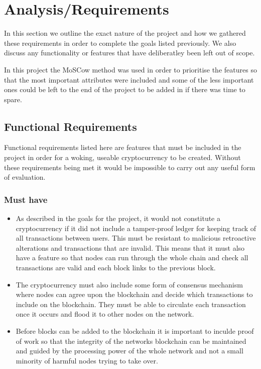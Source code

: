 \documentclass{l4proj}
\begin{document}
\chapter{Analysis/Requirements}
In this section we outline the exact nature of the project and how we gathered these requirements in order to 
complete the goals listed previously. We also discuss any functionality or features that have deliberatley been
left out of scope.

In this project the MoSCow method was used in order to prioritise the features so that the most important attributes
were included and some of the less important ones could be left to the end of the project to be added in if there was
time to spare.

\section{Functional Requirements}
Functional requirements listed here are features that must be included in the project in order for a woking,
useable cryptocurrency to be created. Without these requirements being met it would be impossible to carry out any
useful form of evaluation.

\subsection{Must have}
\begin{itemize}
    \item As described in the goals for the project, it would not constitute a cryptocurrency if it did not include a tamper-proof
        ledger for keeping track of all transactions between users. This must be resistant to malicious retroactive alterations
        and transactions that are invalid. This means that it must also have a feature so that nodes can run through the 
        whole chain and check all transactions are valid and each block links to the previous block.

    \item The cryptocurrency must also include some form of consensus mechanism where nodes can agree upon the blockchain
        and decide which transactions to include on the blockchain. They must be able to circulate each transaction once
        it occurs and flood it to other nodes on the network.
    
    \item Before blocks can be added to the blockchain it is important to inculde proof of work so that the integrity of the 
        networks blockchain can be maintained and guided by the processing power of the whole network and not a small minority
        of harmful nodes trying to take over.
\end{itemize}
\end{document}
